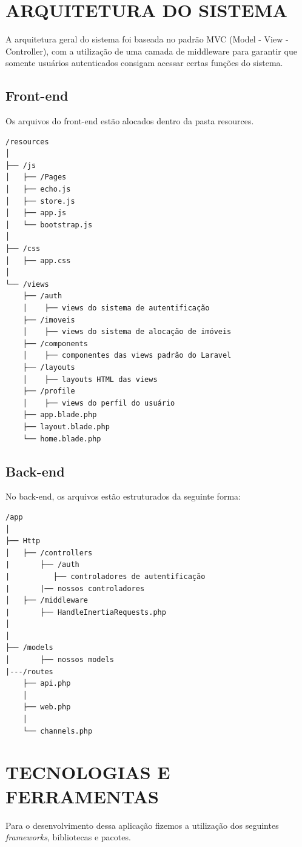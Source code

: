 \section{ARQUITETURA DO SISTEMA}

A arquitetura geral do sistema foi baseada no padrão MVC (Model - View - Controller), com a utilização de uma camada de middleware para garantir que somente usuários autenticados consigam acessar certas funções do sistema.

\subsection{Front-end}

Os arquivos do front-end estão alocados dentro da pasta resources.

\begin{verbatim}
/resources
│
├── /js
│   ├── /Pages
│   ├── echo.js
│   ├── store.js
│   ├── app.js              
│   └── bootstrap.js         
│
├── /css                   
│   ├── app.css            
│   
└── /views
    ├── /auth    
    │    ├── views do sistema de autentificação
    ├── /imoveis   
    │    ├── views do sistema de alocação de imóveis
    ├── /components  
    │    ├── componentes das views padrão do Laravel
    ├── /layouts   
    │    ├── layouts HTML das views
    ├── /profile   
    │    ├── views do perfil do usuário
    ├── app.blade.php
    ├── layout.blade.php    
    └── home.blade.php  
\end{verbatim}
    

\subsection{Back-end}

No back-end, os arquivos estão estruturados da seguinte forma:

\begin{verbatim}
/app
│
├── Http
│   ├── /controllers  
|       ├── /auth
|          ├── controladores de autentificação
|       |── nossos controladores
│   ├── /middleware
|       ├── HandleInertiaRequests.php
│               
│
├── /models                 
│       ├── nossos models
|---/routes
    ├── api.php             
    │
    ├── web.php                
    │
    └── channels.php               
\end{verbatim}







\section{TECNOLOGIAS E FERRAMENTAS}
Para o desenvolvimento dessa aplicação fizemos a utilização dos seguintes \textit{frameworks}, bibliotecas e pacotes.

